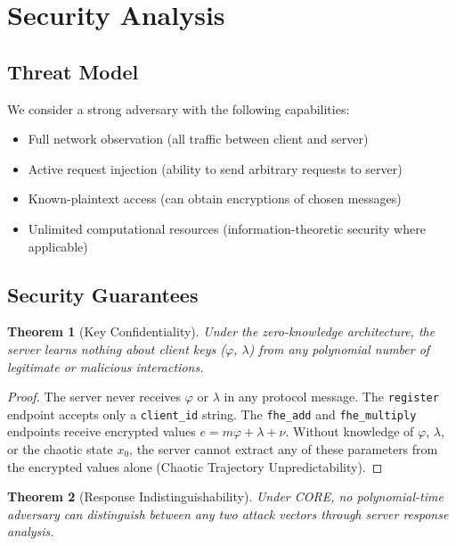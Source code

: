 \documentclass{article}
\newtheorem{theorem}{Theorem}[section]
\begin{document}
\section{Security Analysis}

\subsection{Threat Model}

We consider a strong adversary with the following capabilities:
\begin{itemize}
    \item Full network observation (all traffic between client and server)
    \item Active request injection (ability to send arbitrary requests to server)
    \item Known-plaintext access (can obtain encryptions of chosen messages)
    \item Unlimited computational resources (information-theoretic security where applicable)
\end{itemize}

\subsection{Security Guarantees}

\begin{theorem}[Key Confidentiality]
Under the zero-knowledge architecture, the server learns nothing about client keys ($\varphi$, $\lambda$) from any polynomial number of legitimate or malicious interactions.
\end{theorem}

\begin{proof}
The server never receives $\varphi$ or $\lambda$ in any protocol message. The \texttt{register} endpoint accepts only a \texttt{client\_id} string. The \texttt{fhe\_add} and \texttt{fhe\_multiply} endpoints receive encrypted values $e = m\varphi + \lambda + \nu$. Without knowledge of $\varphi$, $\lambda$, or the chaotic state $x_0$, the server cannot extract any of these parameters from the encrypted values alone (Chaotic Trajectory Unpredictability).
\end{proof}

\begin{theorem}[Response Indistinguishability]
Under CORE, no polynomial-time adversary can distinguish between any two attack vectors through server response analysis.
\end{theorem}
\end{document}
